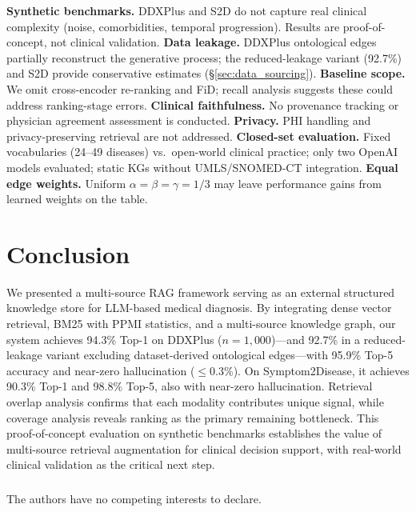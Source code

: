 \documentclass[runningheads]{llncs}
\begin{document}
\textbf{Synthetic benchmarks.} DDXPlus and S2D do not capture real clinical complexity (noise, comorbidities, temporal progression). Results are proof-of-concept, not clinical validation.
\textbf{Data leakage.} DDXPlus ontological edges partially reconstruct the generative process; the reduced-leakage variant (92.7\%) and S2D provide conservative estimates (\S\ref{sec:data_sourcing}).
\textbf{Baseline scope.} We omit cross-encoder re-ranking and FiD; recall analysis suggests these could address ranking-stage errors.
\textbf{Clinical faithfulness.} No provenance tracking or physician agreement assessment is conducted.
\textbf{Privacy.} PHI handling and privacy-preserving retrieval are not addressed.
\textbf{Closed-set evaluation.} Fixed vocabularies (24--49 diseases) vs.\ open-world clinical practice; only two OpenAI models evaluated; static KGs without UMLS/SNOMED-CT integration.
\textbf{Equal edge weights.} Uniform $\alpha{=}\beta{=}\gamma{=}1/3$ may leave performance gains from learned weights on the table.

\section{Conclusion}
\label{sec:conclusion}

We presented a multi-source RAG framework serving as an external structured knowledge store for LLM-based medical diagnosis. By integrating dense vector retrieval, BM25 with PPMI statistics, and a multi-source knowledge graph, our system achieves 94.3\% Top-1 on DDXPlus ($n{=}1{,}000$)---and 92.7\% in a reduced-leakage variant excluding dataset-derived ontological edges---with 95.9\% Top-5 accuracy and near-zero hallucination ($\leq$0.3\%). On Symptom2Disease, it achieves 90.3\% Top-1 and 98.8\% Top-5, also with near-zero hallucination. Retrieval overlap analysis confirms that each modality contributes unique signal, while coverage analysis reveals ranking as the primary remaining bottleneck. This proof-of-concept evaluation on synthetic benchmarks establishes the value of multi-source retrieval augmentation for clinical decision support, with real-world clinical validation as the critical next step.

\begin{credits}
\subsubsection{\discintname}
The authors have no competing interests to declare.
\end{credits}
\end{document}
